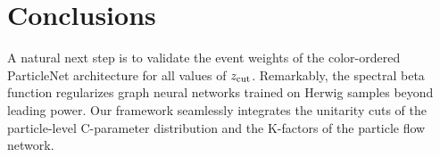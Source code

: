 \section{Conclusions}\label{sec:conclusions}

A natural next step is to validate the event weights of the
color-ordered ParticleNet architecture for all values of $z_{\rm cut}$.
Remarkably, the spectral beta function regularizes graph neural networks
trained on Herwig samples beyond leading power. Our framework seamlessly
integrates the unitarity cuts of the particle-level C-parameter
distribution and the K-factors of the particle flow network.

